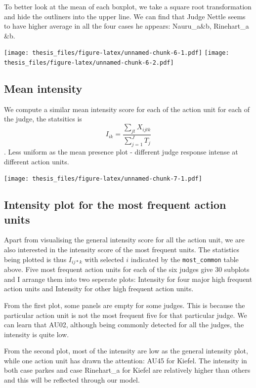 \documentclass{monashthesis}
\begin{document}
To better look at the mean of each boxplot, we take a square root transformation and hide the outliners into the upper line. We can find that Judge Nettle seems to have higher average in all the four cases he appears: Nauru\_a\&b, Rinehart\_a \&b.

\texttt{[image: thesis\_files/figure-latex/unnamed-chunk-6-1.pdf]} \texttt{[image: thesis\_files/figure-latex/unnamed-chunk-6-2.pdf]}

\hypertarget{mean-intensity}{%
\subsection{Mean intensity}\label{mean-intensity}}

We compute a similar mean intensity score for each of the action unit for each of the judge, the statsitics is \[I_{ik} = \frac{\sum_{jt}X_{ijtk}}{\sum_{j = 1}^JT_j}\]. Less uniform as the mean presence plot - different judge response intense at different action units.

\texttt{[image: thesis\_files/figure-latex/unnamed-chunk-7-1.pdf]}

\hypertarget{intensity-plot-for-the-most-frequent-action-units}{%
\subsection{Intensity plot for the most frequent action units}\label{intensity-plot-for-the-most-frequent-action-units}}

Apart from visualising the general intensity score for all the action unit, we are also interested in the intensity score of the most frequent units. The statistics being plotted is thus \(I_{ij*k}\) with selected \(i\) indicated by the \texttt{most\_common} table above. Five most frequent action units for each of the six judges give 30 subplots and I arrange them into two seperate plots: Intensity for four major high frequent action units and Intensity for other high frequent action units.

From the first plot, some panels are empty for some judges. This is because the particular action unit is not the most frequent five for that particular judge. We can learn that AU02, although being commonly detected for all the judges, the intensity is quite low.

From the second plot, most of the intensity are low as the general intensity plot, while one action unit has drawn the attention: AU45 for Kiefel. The intensity in both case parkes and case Rinehart\_a for Kiefel are relatively higher than others and this will be reflected through our model.
\end{document}

